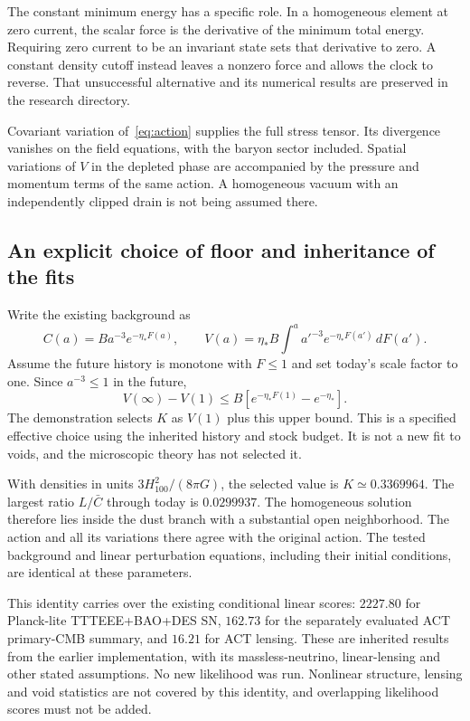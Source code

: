 \documentclass[11pt]{article}
\begin{document}
The constant minimum energy has a specific role. In a homogeneous element
at zero current, the scalar force is the derivative of the minimum total
energy. Requiring zero current to be an invariant state sets that derivative
to zero. A constant density cutoff instead leaves a nonzero force and allows
the clock to reverse. That unsuccessful alternative and its numerical
results are preserved in the research directory.

Covariant variation of~\eqref{eq:action} supplies the full stress tensor.
Its divergence vanishes on the field equations, with the baryon sector
included. Spatial variations of $V$ in the depleted phase are accompanied
by the pressure and momentum terms of the same action. A homogeneous vacuum
with an independently clipped drain is not being assumed there.

\subsection{An explicit choice of floor and inheritance of the fits}
Write the existing background as
\begin{equation}
 C(a)=B a^{-3}e^{-\eta_*F(a)},\qquad
 V(a)=\eta_* B\int^a a'^{-3}e^{-\eta_*F(a')}\,dF(a').
\end{equation}
Assume the future history is monotone with $F\le1$ and set today's scale
factor to one. Since $a^{-3}\le1$ in the future,
\begin{equation}
 V(\infty)-V(1)\le B[e^{-\eta_*F(1)}-e^{-\eta_*}].
\end{equation}
The demonstration selects $K$ as $V(1)$ plus this upper bound. This is a
specified effective choice using the inherited history and stock budget.
It is not a new fit to voids, and the microscopic theory has not selected it.

With densities in units $3H_{100}^2/(8\pi G)$, the selected value is
$K\simeq0.3369964$. The largest ratio $L/\bar C$ through today is
$0.0299937$. The homogeneous solution therefore lies inside the dust
branch with a substantial open neighborhood. The action and all its
variations there agree with the original action. The tested background and
linear perturbation equations, including their initial conditions, are
identical at these parameters.

This identity carries over the existing conditional linear scores:
$2227.80$ for Planck-lite TTTEEE+BAO+DES SN, $162.73$ for the separately
evaluated ACT primary-CMB summary, and $16.21$ for ACT lensing. These are
inherited results from the earlier implementation, with its massless-neutrino,
linear-lensing and other stated assumptions. No new likelihood was run.
Nonlinear structure, lensing and void statistics are not covered by this
identity, and overlapping likelihood scores must not be added.
\end{document}
